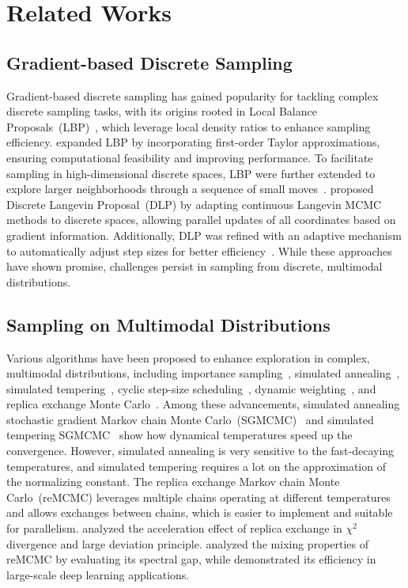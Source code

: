 \section{Related Works}
\label{sec:2}
\subsection{Gradient-based Discrete Sampling}\label{sec:2.1}
Gradient-based discrete sampling has gained popularity for tackling complex discrete sampling tasks, with its origins rooted in Local Balance Proposals~(LBP)~\citep{zanella2020informed}, which leverage local density ratios to enhance sampling efficiency. \citet{grathwohl2021oops} expanded LBP by incorporating first-order Taylor approximations, ensuring computational feasibility and improving performance. To facilitate sampling in high-dimensional discrete spaces, LBP were further extended to explore larger neighborhoods through a sequence of small moves~\citep{sun2021path}. \citet{zhang2022langevin} proposed Discrete Langevin Proposal~(DLP) by adapting continuous Langevin MCMC methods to discrete spaces, allowing parallel updates of all coordinates based on gradient information. Additionally, DLP was refined with an adaptive mechanism to automatically adjust step sizes for better efficiency~\citep{sun2023any}. While these approaches have shown promise, challenges persist in sampling from discrete, multimodal distributions.

\subsection{Sampling on Multimodal Distributions}\label{sec:2.2}
Various algorithms have been proposed to enhance exploration in complex, multimodal distributions, including importance sampling~\citep{wang2001efficient}, simulated annealing~\citep{kirkpatrick1983optimization}, simulated tempering~\citep{marinari1992simulated}, cyclic step-size scheduling~\citep{zhang2019cyclical}, dynamic weighting~\citep{wong1997dynamic}, and replica exchange Monte Carlo~\citep{swendsen1986replica, earl2005parallel}. Among these advancements, simulated annealing stochastic gradient Markov chain Monte Carlo~(SGMCMC)~\citep{mangoubi2018convex} and simulated tempering SGMCMC~\citep{ge2018simulated} show how dynamical temperatures speed up the convergence. However, simulated annealing is very sensitive to the fast-decaying temperatures, and simulated tempering requires a lot on the approximation of the normalizing constant. The replica exchange Markov chain Monte Carlo~(reMCMC) leverages multiple chains operating at different temperatures and allows exchanges between chains, which is easier to implement and suitable for parallelism. \citet{chen2020accelerating} analyzed the acceleration effect of replica exchange in $\chi^2$ divergence and large deviation principle. \citet{dong2022spectral} analyzed the mixing properties of reMCMC by evaluating its spectral gap, while \citet{deng2020non, deng2020accelerating} demonstrated its efficiency in large-scale deep learning applications. 

